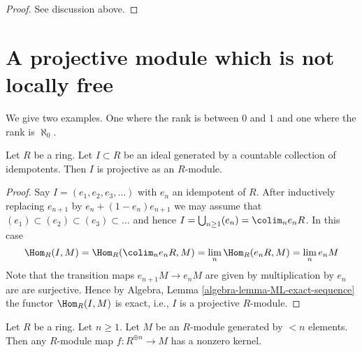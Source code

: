 \begin{proof}
See discussion above.
\end{proof}



\section{A projective module which is not locally free}
\label{section-projective-not-locally-free}

\noindent
We give two examples. One where the rank is between $0$ and $1$
and one where the rank is $\aleph_0$.

\begin{lemma}
\label{lemma-ideal-generated-by-idempotents-projective}
Let $R$ be a ring. Let $I \subset R$ be an ideal generated by
a countable collection of idempotents. Then $I$ is projective
as an $R$-module.
\end{lemma}

\begin{proof}
Say $I = (e_1, e_2, e_3, \ldots)$ with $e_n$ an idempotent of $R$.
After inductively replacing $e_{n + 1}$ by $e_n + (1 - e_n)e_{n + 1}$
we may assume that $(e_1) \subset (e_2) \subset (e_3) \subset \ldots$
and hence $I = \bigcup_{n \geq 1} (e_n) = \colim_n e_nR$.
In this case
$$
\Hom_R(I, M) = \Hom_R(\colim_n e_nR, M)
= \lim_n \Hom_R(e_nR, M) = \lim_n e_nM
$$
Note that the transition maps $e_{n + 1}M \to e_nM$ are given
by multiplication by $e_n$ are are surjective. Hence by
Algebra, Lemma \ref{algebra-lemma-ML-exact-sequence}
the functor $\Hom_R(I, M)$ is exact, i.e., $I$ is a projective
$R$-module.
\end{proof}

\begin{lemma}
\label{lemma-map-cannot-be-injective}
Let $R$ be a ring. Let $n \geq 1$. Let $M$ be an $R$-module generated
by $< n$ elements. Then any $R$-module map $f : R^{\oplus n} \to M$ has a
nonzero kernel.
\end{lemma}

